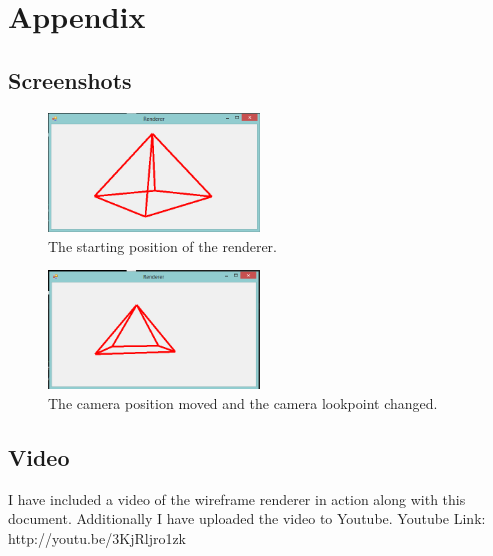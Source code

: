 \pagebreak
\section{Appendix}
\subsection{Screenshots}
\begin{figure}[h!]
  \centering
    \includegraphics[width=0.5\textwidth]{Screenshots/StartingPosition}
  \caption{The starting position of the renderer.}
\end{figure}
\begin{figure}[h!]
  \centering
    \includegraphics[width=0.5\textwidth]{Screenshots/RotatedAndMoved}
  \caption{The camera position moved and the camera lookpoint changed.}
\end{figure}
\subsection{Video}
I have included a video of the wireframe renderer in action along with this document. Additionally I have uploaded the video to Youtube.
Youtube Link: http://youtu.be/3KjRljro1zk